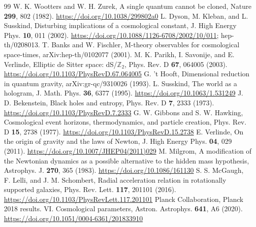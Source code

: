 \documentclass[aps,prd,twocolumn,superscriptaddress,nofootinbib]{revtex4-2}
\begin{document}
\begin{thebibliography}{99}
 W. K. Wootters and W. H. Zurek, A single quantum cannot be cloned, Nature \textbf{299}, 802 (1982). \url{https://doi.org/10.1038/299802a0}
 L. Dyson, M. Kleban, and L. Susskind, Disturbing implications of a cosmological constant, J. High Energy Phys. \textbf{10}, 011 (2002). \url{https://doi.org/10.1088/1126-6708/2002/10/011}; hep-th/0208013.
 T. Banks and W. Fischler, M-theory observables for cosmological space-times, arXiv:hep-th/0102077 (2001).
 M. K. Parikh, I. Savonije, and E. Verlinde, Elliptic de Sitter space: dS/$\mathbb{Z}_2$, Phys. Rev. D \textbf{67}, 064005 (2003). \url{https://doi.org/10.1103/PhysRevD.67.064005}
 G. 't Hooft, Dimensional reduction in quantum gravity, arXiv:gr-qc/9310026 (1993).
 L. Susskind, The world as a hologram, J. Math. Phys. \textbf{36}, 6377 (1995). \url{https://doi.org/10.1063/1.531249}
 J. D. Bekenstein, Black holes and entropy, Phys. Rev. D \textbf{7}, 2333 (1973). \url{https://doi.org/10.1103/PhysRevD.7.2333}
 G. W. Gibbons and S. W. Hawking, Cosmological event horizons, thermodynamics, and particle creation, Phys. Rev. D \textbf{15}, 2738 (1977). \url{https://doi.org/10.1103/PhysRevD.15.2738}
 E. Verlinde, On the origin of gravity and the laws of Newton, J. High Energy Phys. \textbf{04}, 029 (2011). \url{https://doi.org/10.1007/JHEP04(2011)029}
 M. Milgrom, A modification of the Newtonian dynamics as a possible alternative to the hidden mass hypothesis, Astrophys. J. \textbf{270}, 365 (1983). \url{https://doi.org/10.1086/161130}
 S. S. McGaugh, F. Lelli, and J. M. Schombert, Radial acceleration relation in rotationally supported galaxies, Phys. Rev. Lett. \textbf{117}, 201101 (2016). \url{https://doi.org/10.1103/PhysRevLett.117.201101}
 Planck Collaboration, Planck 2018 results. VI. Cosmological parameters, Astron. Astrophys. \textbf{641}, A6 (2020). \url{https://doi.org/10.1051/0004-6361/201833910}
\end{thebibliography}
\end{document}
